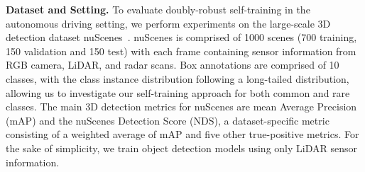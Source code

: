 \noindent \textbf{Dataset and Setting.} 
To evaluate doubly-robust self-training in the autonomous driving setting, we perform experiments on the large-scale 3D detection dataset nuScenes~\cite{nuscenes2019}. nuScenes is comprised of 1000 scenes (700 training, 150 validation and 150 test) with each frame containing sensor information from RGB camera, LiDAR, and radar scans. Box annotations are comprised of 10 classes, with the class instance distribution following a long-tailed distribution, allowing us to investigate our self-training approach for both common and rare classes. The main 3D detection metrics for nuScenes are mean Average Precision (mAP) and the nuScenes Detection Score (NDS), a dataset-specific metric consisting of a weighted average of mAP and five other true-positive metrics. For the sake of simplicity, we train object detection models using only LiDAR sensor information.



\begin{table}[t]
\footnotesize
\setlength{\tabcolsep}{13pt}
\renewcommand\arraystretch{1.05}
\centering
\caption{Performance comparison on nuScenes \textit{val} set.}
\label{nuscresults}
\vspace{-6pt}
\end{table}


